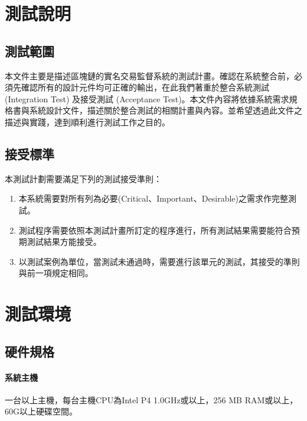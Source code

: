  	\section{測試說明}

 		\subsection{測試範圍}本文件主要是描述區塊鏈的實名交易監督系統的測試計畫。確認在系統整合前，必須先確認所有的設計元件均可正確的輸出，在此我們著重於整合系統測試 (Integration Test) 及接受測試 (Acceptance Test)。本文件內容將依據系統需求規格書與系統設計文件，描述關於整合測試的相關計畫與內容。並希望透過此文件之描述與實踐，達到順利進行測試工作之目的。

 		\subsection{接受標準}本測試計劃需要滿足下列的測試接受準則： 

 			\begin{enumerate}
				\item 本系統需要對所有列為必要(Critical、Important、Desirable)之需求作完整測試。
				\item 測試程序需要依照本測試計畫所訂定的程序進行，所有測試結果需要能符合預期測試結果方能接受。
				\item 以測試案例為單位，當測試未通過時，需要進行該單元的測試，其接受的準則與前一項規定相同。 
			\end{enumerate}
 	
 	\section{測試環境}

 		\subsection{硬件規格}
 			
 			\paragraph{系統主機}一台以上主機，每台主機CPU為Intel P4 1.0GHz或以上，256 MB RAM或以上，60G以上硬碟空間。
